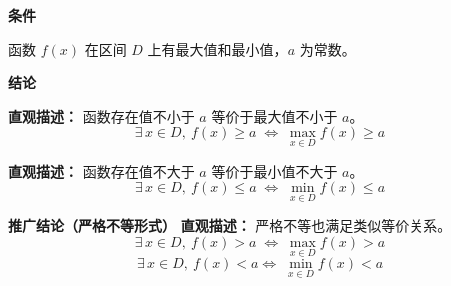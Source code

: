 \begin{statementbox}
	\textbf{\textcolor{CStatement}{条件}}
	\begin{description}[style=nextline, leftmargin=2.8em, labelsep=0.5em, itemsep=0.35em]
		\item[\textbf{\textcolor{CStatement}{条件 1（有最值区间）：}}]
			函数 $f(x)$ 在区间 $D$ 上有最大值和最小值，$a$ 为常数。
	\end{description}
	\textbf{\textcolor{CStatement}{结论}}
	\begin{description}[style=nextline, leftmargin=2.8em, labelsep=0.5em, itemsep=0.45em]
		\item[\textbf{\textcolor{CStatement}{结论一（最大值转化）：}}]
			\textbf{\textcolor{CStatement}{直观描述：}}
			函数存在值不小于 $a$ 等价于最大值不小于 $a$。
			\[
				\boxed{\exists\, x\in D,\ f(x)\ge a \;\iff\; \max_{x\in D}f(x)\ge a}
			\]
		\item[\textbf{\textcolor{CStatement}{结论二（最小值转化）：}}]
			\textbf{\textcolor{CStatement}{直观描述：}}
			函数存在值不大于 $a$ 等价于最小值不大于 $a$。
			\[
				\boxed{\exists\, x\in D,\ f(x)\le a \;\iff\; \min_{x\in D}f(x)\le a}
			\]
	\end{description}
	\textbf{\textcolor{CStatement}{推广结论（严格不等形式）}}
	\textbf{\textcolor{CStatement}{直观描述：}}
	严格不等也满足类似等价关系。
	\[
		\boxed{\exists\, x\in D,\ f(x)>a \;\iff\; \max_{x\in D}f(x)>a}
	\]
	\[
		\boxed{\exists\, x\in D,\ f(x)<a \iff\; \min_{x\in D}f(x)<a}
	\]
\end{statementbox}
